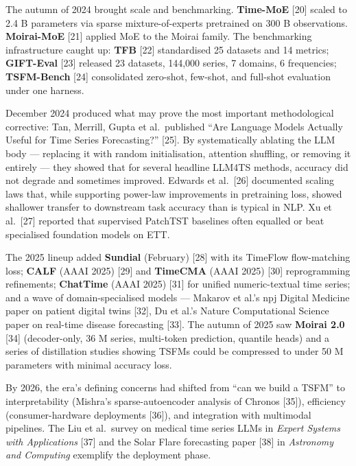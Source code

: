 \documentclass{article}
\begin{document}
The autumn of 2024 brought scale and benchmarking. \textbf{Time-MoE} \citep{shi2024timemoebillionscal} {[}20{]} scaled to 2.4 B parameters via sparse mixture-of-experts pretrained on 300 B observations. \textbf{Moirai-MoE} \citep{liu2024itransformerinvert} {[}21{]} applied MoE to the Moirai family. The benchmarking infrastructure caught up: \textbf{TFB} \citep{qiu2024tfbtowardscomprehe} {[}22{]} standardised 25 datasets and 14 metrics; \textbf{GIFT-Eval} \citep{aksu2024giftevalabenchmark} {[}23{]} released 23 datasets, 144,000 series, 7 domains, 6 frequencies; \textbf{TSFM-Bench} \citep{li2025tsfmbenchacomprehe} {[}24{]} consolidated zero-shot, few-shot, and full-shot evaluation under one harness.

December 2024 produced what may prove the most important methodological corrective: Tan, Merrill, Gupta et al.~published ``Are Language Models Actually Useful for Time Series Forecasting?'' {[}25{]}. By systematically ablating the LLM body --- replacing it with random initialisation, attention shuffling, or removing it entirely --- they showed that for several headline LLM4TS methods, accuracy did not degrade and sometimes improved. Edwards et al.~{[}26{]} documented scaling laws that, while supporting power-law improvements in pretraining loss, showed shallower transfer to downstream task accuracy than is typical in NLP. Xu et al.~{[}27{]} reported that supervised PatchTST baselines often equalled or beat specialised foundation models on ETT.

The 2025 lineup added \textbf{Sundial} (February) {[}28{]} with its TimeFlow flow-matching loss; \textbf{CALF} (AAAI 2025) {[}29{]} and \textbf{TimeCMA} (AAAI 2025) {[}30{]} reprogramming refinements; \textbf{ChatTime} (AAAI 2025) {[}31{]} for unified numeric-textual time series; and a wave of domain-specialised models --- Makarov et al.'s npj Digital Medicine paper on patient digital twins {[}32{]}, Du et al.'s Nature Computational Science paper on real-time disease forecasting {[}33{]}. The autumn of 2025 saw \textbf{Moirai 2.0} {[}34{]} (decoder-only, 36 M series, multi-token prediction, quantile heads) and a series of distillation studies showing TSFMs could be compressed to under 50 M parameters with minimal accuracy loss.

By 2026, the era's defining concerns had shifted from ``can we build a TSFM'' to interpretability (Mishra's sparse-autoencoder analysis of Chronos {[}35{]}), efficiency (consumer-hardware deployments {[}36{]}), and integration with multimodal pipelines. The Liu et al.~survey on medical time series LLMs in \emph{Expert Systems with Applications} {[}37{]} and the Solar Flare forecasting paper {[}38{]} in \emph{Astronomy and Computing} exemplify the deployment phase.
\end{document}
